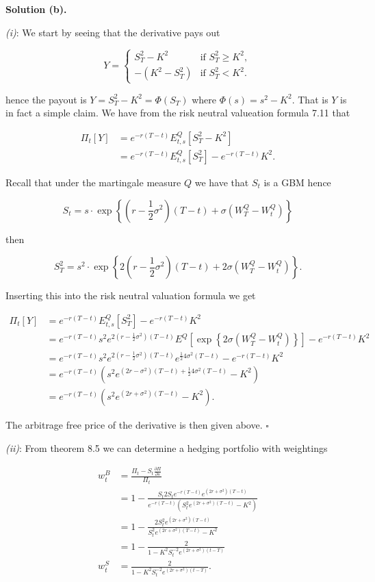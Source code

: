 \documentclass[
]{article}
\begin{document}
\textbf{Solution (b).}

\emph{(i)}: We start by seeing that the derivative pays out

\[
Y=
\begin{cases}
  S_T^2-K^2 & \text{if }S_T^2\ge K^2,\\
  -(K^2-S_T^2) &\text{if }S_T^2< K^2.
\end{cases}
\]

hence the payout is \(Y=S_T^2-K^2=\Phi(S_T)\) where \(\Phi(s)=s^2-K^2\).
That is \(Y\) is in fact a simple claim. We have from the risk neutral
valueation formula 7.11 that

\begin{align*}
\Pi_t[Y]&=e^{-r(T-t)}E^Q_{t,s}[S_T^2-K^2]\\
&=e^{-r(T-t)}E^Q_{t,s}[S_T^2]-e^{-r(T-t)}K^2.
\end{align*}

Recall that under the martingale measure \(Q\) we have that \(S_t\) is a
GBM hence

\[
S_t=s\cdot \exp\left\{\left(r-\frac{1}{2}\sigma^2\right)(T-t)+\sigma\left(W_T^Q-W_t^Q\right)\right\}
\]

then

\[
S_T^2=s^2\cdot \exp\left\{2\left(r-\frac{1}{2}\sigma^2\right)(T-t)+2\sigma\left(W_T^Q-W_t^Q\right)\right\}.
\]

Inserting this into the risk neutral valuation formula we get

\begin{align*}
\Pi_t[Y]&=e^{-r(T-t)}E^Q_{t,s}[S_T^2]-e^{-r(T-t)}K^2\\
&=e^{-r(T-t)}s^2e^{2\left(r-\frac{1}{2}\sigma^2\right)(T-t)} E^Q\left[\exp\left\{2\sigma\left(W_T^Q-W_t^Q\right)\right\}\right]-e^{-r(T-t)}K^2\\
&=e^{-r(T-t)}s^2e^{2\left(r-\frac{1}{2}\sigma^2\right)(T-t)}e^{\frac{1}{2}4\sigma^2(T-t)}-e^{-r(T-t)}K^2\\
&=e^{-r(T-t)}\left(s^2e^{(2r-\sigma^2)(T-t)+\frac{1}{2}4\sigma^2(T-t)}-K^2\right)\\
&=e^{-r(T-t)}\left(s^2e^{(2r+\sigma^2)(T-t)}-K^2\right).
\end{align*}

The arbitrage free price of the derivative is then given above.
\(\square\)

\emph{(ii)}: From theorem 8.5 we can determine a hedging portfolio with
weightings

\begin{align*}
w_t^B&=\frac{\Pi_t-S_t\frac{\partial\Pi}{\partial s}}{\Pi_t}\\
&=1-\frac{S_t2S_te^{-r(T-t)}e^{(2r+\sigma^2)(T-t)}}{e^{-r(T-t)}\left(S_t^2e^{(2r+\sigma^2)(T-t)}-K^2\right)}\\
&=1-\frac{2S_t^2e^{(2r+\sigma^2)(T-t)}}{S_t^2e^{(2r+\sigma^2)(T-t)}-K^2}\\
&=1-\frac{2}{1-K^2S_t^{-2}e^{(2r+\sigma^2)(t-T)}}\\
w_t^S&=\frac{2}{1-K^2S_t^{-2}e^{(2r+\sigma^2)(t-T)}}.
\end{align*}
\end{document}
